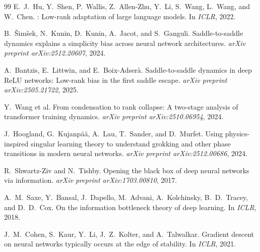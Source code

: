 \documentclass{article}
\theoremstyle{definition}
\begin{document}
\begin{thebibliography}{99}
E.~J.~Hu, Y.~Shen, P.~Wallis, Z.~Allen-Zhu, Y.~Li, S.~Wang, L.~Wang, and W.~Chen.
: Low-rank adaptation of large language models.
\newblock In \emph{ICLR}, 2022.

B.~\v{S}im\v{s}ek, N.~Kunin, D.~Kunin, A.~Jacot, and S.~Ganguli.
\newblock Saddle-to-saddle dynamics explains a simplicity bias across neural network architectures.
\newblock \emph{arXiv preprint arXiv:2512.20607}, 2024.

A.~Bantzis, E.~Littwin, and E.~Boix-Adser\`a.
\newblock Saddle-to-saddle dynamics in deep {ReLU} networks: Low-rank bias in the first saddle escape.
\newblock \emph{arXiv preprint arXiv:2505.21722}, 2025.

Y.~Wang et al.
\newblock From condensation to rank collapse: A two-stage analysis of transformer training dynamics.
\newblock \emph{arXiv preprint arXiv:2510.06954}, 2024.

J.~Hoogland, G.~Kujanp\"a\"a, A.~Lau, T.~Sander, and D.~Murfet.
\newblock Using physics-inspired singular learning theory to understand grokking and other phase transitions in modern neural networks.
\newblock \emph{arXiv preprint arXiv:2512.00686}, 2024.

R.~Shwartz-Ziv and N.~Tishby.
\newblock Opening the black box of deep neural networks via information.
\newblock \emph{arXiv preprint arXiv:1703.00810}, 2017.

A.~M.~Saxe, Y.~Bansal, J.~Dapello, M.~Advani, A.~Kolchinsky, B.~D.~Tracey, and D.~D.~Cox.
\newblock On the information bottleneck theory of deep learning.
\newblock In \emph{ICLR}, 2018.

J.~M.~Cohen, S.~Kaur, Y.~Li, J.~Z.~Kolter, and A.~Talwalkar.
\newblock Gradient descent on neural networks typically occurs at the edge of stability.
\newblock In \emph{ICLR}, 2021.

\end{thebibliography}
\end{document}

